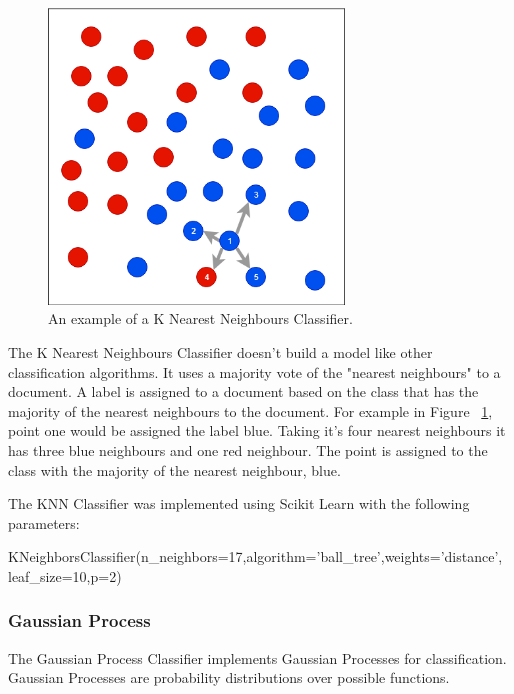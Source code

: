 \begin{figure}[h!]
\centering
\includegraphics[width=0.7\textwidth]{design_and_methodology/knn.png}
\caption{\label{fig:knn} An example of a K Nearest Neighbours Classifier.}
\end{figure}

The K Nearest Neighbours Classifier doesn't build a model like other classification algorithms. It uses a majority vote of the "nearest neighbours" to a document. A label is assigned to a document based on the class that has the majority of the nearest neighbours to the document. For example in Figure ~\ref{fig:knn}, point one would be assigned the label blue. Taking it's four nearest neighbours it has three blue neighbours and one red neighbour. The point is assigned to the class with the majority of the nearest neighbour, blue.

The KNN Classifier was implemented using Scikit Learn with the following parameters:

\begin{tcolorbox}
\begin{center}
	KNeighborsClassifier(n\_neighbors=17,algorithm='ball\_tree',weights='distance',
	leaf\_size=10,p=2)
\end{center}
\end{tcolorbox}

\subsubsection*{Gaussian Process}

The Gaussian Process Classifier implements Gaussian Processes for classification. Gaussian Processes are probability distributions over possible functions.

